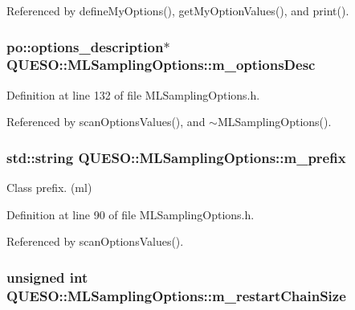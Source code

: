 Referenced by define\-My\-Options(), get\-My\-Option\-Values(), and print().

\hypertarget{class_q_u_e_s_o_1_1_m_l_sampling_options_afc13079420db3e2c7eaf97ca4d44cc97}{
\subsubsection[{m\-\_\-options\-Desc}]{\setlength{\rightskip}{0pt plus 5cm}po\-::options\-\_\-description$\ast$ Q\-U\-E\-S\-O\-::\-M\-L\-Sampling\-Options\-::m\-\_\-options\-Desc\hspace{0.3cm}{\ttfamily [private]}}}\label{class_q_u_e_s_o_1_1_m_l_sampling_options_afc13079420db3e2c7eaf97ca4d44cc97}


Definition at line 132 of file M\-L\-Sampling\-Options.\-h.



Referenced by scan\-Options\-Values(), and $\sim$\-M\-L\-Sampling\-Options().

\hypertarget{class_q_u_e_s_o_1_1_m_l_sampling_options_a1d3d48598e0b59b46337ce66a52671a5}{
\subsubsection[{m\-\_\-prefix}]{\setlength{\rightskip}{0pt plus 5cm}std\-::string Q\-U\-E\-S\-O\-::\-M\-L\-Sampling\-Options\-::m\-\_\-prefix}}\label{class_q_u_e_s_o_1_1_m_l_sampling_options_a1d3d48598e0b59b46337ce66a52671a5}


Class prefix. (ml) 



Definition at line 90 of file M\-L\-Sampling\-Options.\-h.



Referenced by scan\-Options\-Values().

\hypertarget{class_q_u_e_s_o_1_1_m_l_sampling_options_a073caa3483cbca881934842451412681}{
\subsubsection[{m\-\_\-restart\-Chain\-Size}]{\setlength{\rightskip}{0pt plus 5cm}unsigned int Q\-U\-E\-S\-O\-::\-M\-L\-Sampling\-Options\-::m\-\_\-restart\-Chain\-Size}}\label{class_q_u_e_s_o_1_1_m_l_sampling_options_a073caa3483cbca881934842451412681}


